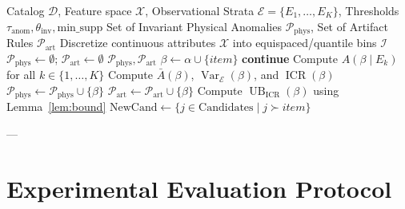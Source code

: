 \documentclass[10pt,a4paper]{article}
\begin{document}
\begin{algorithm}[t]
\caption{\textsc{CondAstro-Miner} Main Mining Procedure}
\label{alg:condastro}
\begin{algorithmic}[1]
\Require Catalog $\mathcal{D}$, Feature space $\mathcal{X}$, Observational Strata $\mathcal{E} = \{E_1, \dots, E_K\}$, Thresholds $\tau_{\text{anom}}, \theta_{\text{inv}}, \text{min\_supp}$
\Ensure Set of Invariant Physical Anomalies $\mathcal{P}_{\text{phys}}$, Set of Artifact Rules $\mathcal{P}_{\text{art}}$
\State Discretize continuous attributes $\mathcal{X}$ into equispaced/quantile bins $\mathcal{I}$
\State $\mathcal{P}_{\text{phys}} \gets \emptyset$; $\mathcal{P}_{\text{art}} \gets \emptyset$
\State {}
\State \Return $\mathcal{P}_{\text{phys}}, \mathcal{P}_{\text{art}}$
\vspace{0.1cm}
        \State $\beta \gets \alpha \cup \{item\}$
         \textbf{continue} \EndIf
        \State Compute $A(\beta \mid E_k)$ for all $k \in \{1, \dots, K\}$
        \State Compute $\bar{A}(\beta)$, $\operatorname{Var}_{\mathcal{E}}(\beta)$, and $\operatorname{ICR}(\beta)$
                \State $\mathcal{P}_{\text{phys}} \gets \mathcal{P}_{\text{phys}} \cup \{\beta\}$ 
            \Else
                \State $\mathcal{P}_{\text{art}} \gets \mathcal{P}_{\text{art}} \cup \{\beta\}$ 
            \EndIf
        \EndIf
        \State Compute $\operatorname{UB}_{\text{ICR}}(\beta)$ using Lemma~\ref{lem:bound}
            \State $\text{NewCand} \gets \{j \in \text{Candidates} \mid j \succ item\}$
            \State {}
        \EndIf
    \EndFor
\EndProcedure
\end{algorithmic}
\end{algorithm}

---

\section{Experimental Evaluation Protocol}
\label{sec:experiments}
\end{document}
